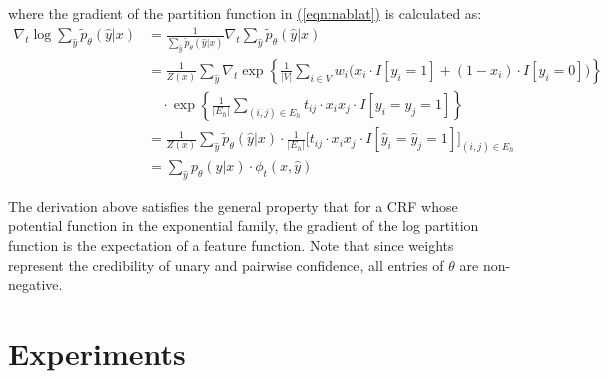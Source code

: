 \documentclass[11pt,a4paper]{book}
\begin{document}
where the gradient of the partition function in \hyperref[eqn:nablat]{(\ref{eqn:nablat})} is calculated as:
\begin{align}
\nabla_t\log\sum_{\hat{y}}\tilde{p}_\theta(\hat{y}|x)&=\frac{1}{\sum_{\hat{y}}\tilde{p}_\theta(\hat{y}|x)}\nabla_t\sum_{\hat{y}}\tilde{p}_\theta(\hat{y}|x)\nonumber\\
&=\frac{1}{Z(x)}\sum_{\hat{y}}\nabla_t\exp\left\{\frac{1}{|V|}\sum_{i\in V}w_i\big(x_i\cdot I[y_i=1]+(1-x_i)\cdot I[y_i=0]\big)\right\}\nonumber\\
&\quad\cdot\exp\left\{\frac{1}{|E_h|}\sum_{(i,j)\in E_h}t_{ij}\cdot x_ix_j\cdot I[y_i=y_j=1]\right\}\nonumber\\
&=\frac{1}{Z(x)}\sum_{\hat{y}}\tilde{p}_\theta(\hat{y}|x)\cdot\frac{1}{|E_h|}\Big[t_{ij}\cdot x_ix_j\cdot I[\hat{y}_i=\hat{y}_j=1]\Big]_{(i,j)\in E_h}\nonumber\\
&=\sum_{\hat{y}}p_\theta(\hat{y}|x)\cdot\phi_t(x,\hat{y})
\end{align}

The derivation above satisfies the general property that for a CRF whose potential function in the exponential family, the gradient of the log partition function is the expectation of a feature function. Note that since weights represent the credibility of unary and pairwise confidence, all entries of $\theta$ are non-negative.

\section{Experiments}
\label{sec:exp2}
\end{document}
